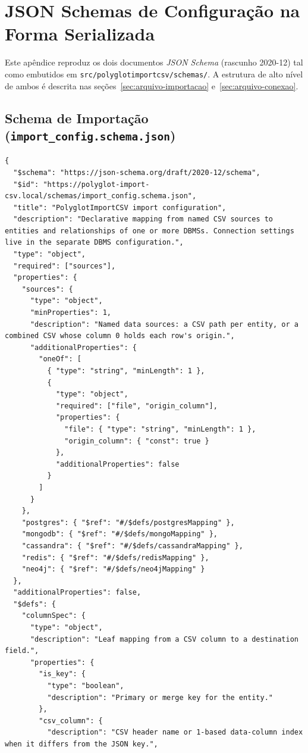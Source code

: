 \chapter{JSON Schemas de Configuração na Forma Serializada}
\label{ap:schemas}

Este apêndice reproduz os dois documentos \textit{JSON Schema} (rascunho 2020-12) tal
como embutidos em \texttt{src/polyglotimportcsv/schemas/}. A estrutura de alto nível
de ambos é descrita nas seções~\ref{sec:arquivo-importacao} e~\ref{sec:arquivo-conexao}.

\section{Schema de Importação (\texttt{import\_config.schema.json})}

\begin{lstlisting}[style=jsonstyle]
{
  "$schema": "https://json-schema.org/draft/2020-12/schema",
  "$id": "https://polyglot-import-csv.local/schemas/import_config.schema.json",
  "title": "PolyglotImportCSV import configuration",
  "description": "Declarative mapping from named CSV sources to entities and relationships of one or more DBMSs. Connection settings live in the separate DBMS configuration.",
  "type": "object",
  "required": ["sources"],
  "properties": {
    "sources": {
      "type": "object",
      "minProperties": 1,
      "description": "Named data sources: a CSV path per entity, or a combined CSV whose column 0 holds each row's origin.",
      "additionalProperties": {
        "oneOf": [
          { "type": "string", "minLength": 1 },
          {
            "type": "object",
            "required": ["file", "origin_column"],
            "properties": {
              "file": { "type": "string", "minLength": 1 },
              "origin_column": { "const": true }
            },
            "additionalProperties": false
          }
        ]
      }
    },
    "postgres": { "$ref": "#/$defs/postgresMapping" },
    "mongodb": { "$ref": "#/$defs/mongoMapping" },
    "cassandra": { "$ref": "#/$defs/cassandraMapping" },
    "redis": { "$ref": "#/$defs/redisMapping" },
    "neo4j": { "$ref": "#/$defs/neo4jMapping" }
  },
  "additionalProperties": false,
  "$defs": {
    "columnSpec": {
      "type": "object",
      "description": "Leaf mapping from a CSV column to a destination field.",
      "properties": {
        "is_key": {
          "type": "boolean",
          "description": "Primary or merge key for the entity."
        },
        "csv_column": {
          "description": "CSV header name or 1-based data-column index when it differs from the JSON key.",

\end{lstlisting}
